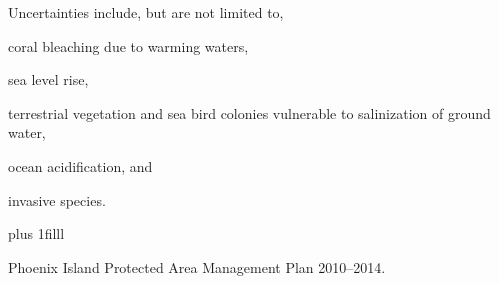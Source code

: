 \documentclass[t]{beamer}
\begin{document}
%

{
\begin{frame}[b,plain]{}
\end{frame}
}
%
\begin{frame}[t]{Uncertainties include, but are not limited to,}

	\hangpara coral bleaching due to warming waters,
	\pause
	
	\hangpara sea level rise,
	\pause
	
	\hangpara terrestrial vegetation and sea bird colonies vulnerable to salinization of ground water, 
	\pause

	\hangpara ocean acidification, and
	\pause
	
	\hangpara invasive species.
	
\vskip0pt plus 1filll

\hfill\tiny Phoenix Island Protected Area Management Plan 2010--2014.

\end{frame}
%
\end{document}
